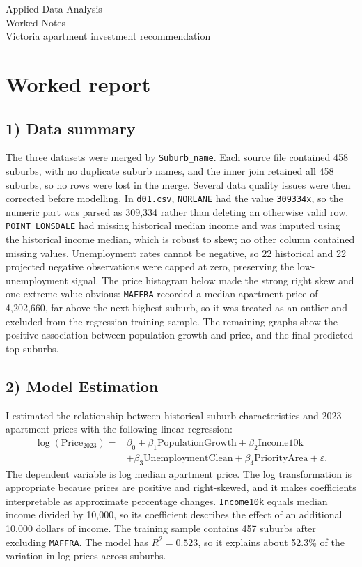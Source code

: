 \documentclass[11pt]{article}
\begin{document}
\begin{center}
{\Large Applied Data Analysis}\\[0.3em]
{\large Worked Notes}\\[0.3em]
{\normalsize Victoria apartment investment recommendation}
\end{center}

\section*{Worked report}

\subsection*{1) Data summary}
The three datasets were merged by \texttt{Suburb\_name}. Each source file contained 458 suburbs, with no duplicate suburb names, and the inner join retained all 458 suburbs, so no rows were lost in the merge. Several data quality issues were then corrected before modelling. In \texttt{d01.csv}, \texttt{NORLANE} had the value \texttt{309334x}, so the numeric part was parsed as 309,334 rather than deleting an otherwise valid row. \texttt{POINT LONSDALE} had missing historical median income and was imputed using the historical income median, which is robust to skew; no other column contained missing values. Unemployment rates cannot be negative, so 22 historical and 22 projected negative observations were capped at zero, preserving the low-unemployment signal. The price histogram below made the strong right skew and one extreme value obvious: \texttt{MAFFRA} recorded a median apartment price of 4,202,660, far above the next highest suburb, so it was treated as an outlier and excluded from the regression training sample. The remaining graphs show the positive association between population growth and price, and the final predicted top suburbs.

\subsection*{2) Model Estimation}
I estimated the relationship between historical suburb characteristics and 2023 apartment prices with the following linear regression:
\[
\begin{aligned}
\log(\text{Price}_{2023})=&
\beta_0+\beta_1\text{PopulationGrowth}+\beta_2\text{Income10k}\\
&+\beta_3\text{UnemploymentClean}+\beta_4\text{PriorityArea}+\varepsilon.
\end{aligned}
\]
The dependent variable is log median apartment price. The log transformation is appropriate because prices are positive and right-skewed, and it makes coefficients interpretable as approximate percentage changes. \texttt{Income10k} equals median income divided by 10,000, so its coefficient describes the effect of an additional 10,000 dollars of income. The training sample contains 457 suburbs after excluding \texttt{MAFFRA}. The model has \(R^2=0.523\), so it explains about 52.3\% of the variation in log prices across suburbs.
\end{document}

